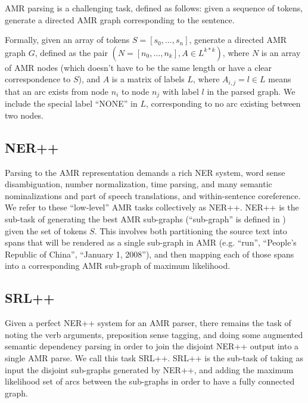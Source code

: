 \documentclass[11pt]{article}
\begin{document}
AMR parsing is a challenging task, defined as follows: given a sequence of tokens, generate a directed AMR graph corresponding to the sentence.

Formally, given an array of tokens $S = [s_0, \ldots, s_n]$, generate a directed AMR graph $G$, defined as the pair $(N = [n_0, \ldots, n_k], A \in L^{k*k})$, where $N$ is an array of AMR nodes (which doesn't have to be the same length or have a clear correspondence to $S$), and $A$ is a matrix of labels $L$, where $A_{i,j} = l \in L$ means that an arc exists from node $n_i$ to node $n_j$ with label $l$ in the parsed graph. We include the special label ``NONE'' in $L$, corresponding to no arc existing between two nodes.


\subsection{NER++}

Parsing to the AMR representation demands a rich NER system, word sense disambiguation, number normalization, time parsing, and many semantic nominalizations and part of speech translations, and within-sentence coreference. We refer to these ``low-level'' AMR tasks collectively as NER++. NER++ is the sub-task of generating the best AMR sub-graphs (``sub-graph'' is defined in ) given the set of tokens $S$. This involves both partitioning the source text into spans that will be rendered as a single sub-graph in AMR (e.g. ``run'', ``People's Republic of China'', ``January 1, 2008''), and then mapping each of those spans into a corresponding AMR sub-graph of maximum likelihood.

\subsection{SRL++}

Given a perfect NER++ system for an AMR parser, there remains the task of noting the verb arguments, preposition sense tagging, and doing some augmented semantic dependency parsing in order to join the disjoint NER++ output into a single AMR parse. We call this task SRL++. SRL++ is the sub-task of taking as input the disjoint sub-graphs generated by NER++, and adding the maximum likelihood set of arcs between the sub-graphs in order to have a fully connected graph.

\end{document}
